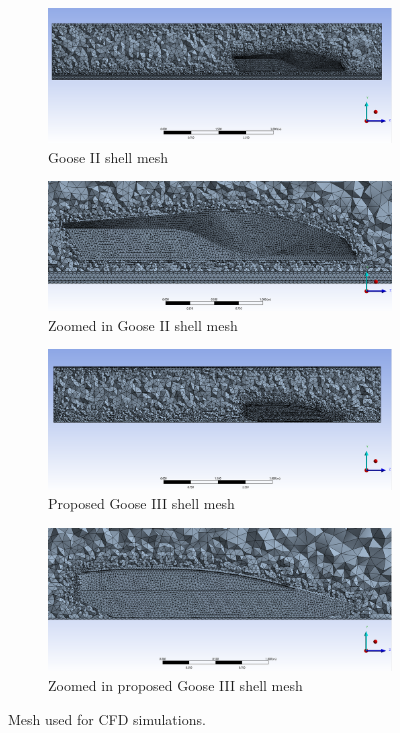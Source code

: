\documentclass[main.tex]{subfiles}
\begin{document}
\begin{figure}
\centering
\begin{subfigure}[h]{0.72\textwidth}
\includegraphics[width=\textwidth]{images/Goose_2_Mesh.PNG}
\caption{Goose II shell mesh}
\end{subfigure}
\begin{subfigure}[h]{0.72\textwidth}
\includegraphics[width=\textwidth]{images/Goose_2_Mesh2.PNG}
\caption{Zoomed in Goose II shell mesh}
\end{subfigure}
\begin{subfigure}[h]{0.72\textwidth}
\includegraphics[width=\textwidth]{images/Victor_Mesh.PNG}
\caption{Proposed Goose III shell mesh}
\end{subfigure}
\begin{subfigure}[h]{0.72\textwidth}
\includegraphics[width=\textwidth]{images/Victor_Mesh2.PNG}
\caption{Zoomed in proposed Goose III shell mesh}
\end{subfigure}
\caption{Mesh used for CFD simulations.}
\label{fig:cfdmesh}
\end{figure}
\end{document}
